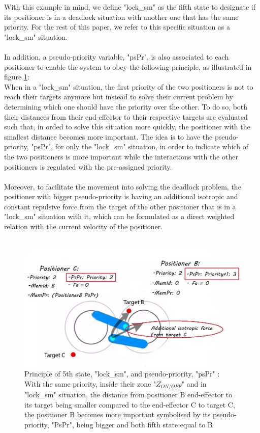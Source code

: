 \documentclass[]{spie}  %
\begin{document}
	
	With this example in mind, we define "lock\_sm" as the fifth state to designate if its positioner is in a deadlock situation with another one that has the same priority. For the rest of this paper, we refer to this specific situation as a "lock\_sm" situation. \\\\
	In addition, a pseudo-priority variable, "psPr", is also associated to each positioner to enable the system to obey the following principle, as illustrated in figure \ref{5thState}:\\
	When in a "lock\_sm" situation, the first priority of the two positioners is not to reach their targets anymore but instead to solve their current problem by determining which one should have the priority over the other. To do so, both their distances from their end-effector to their respective targets are evaluated such that, in orded to solve this situation more quickly, the positioner with the smallest distance becomes more important. The idea is to have the pseudo-priority, "psPr", for only the  "lock\_sm" situation, in order to indicate which of the two positioners is more important while the interactions with the other positioners is regulated with the pre-assigned priority. \\\\
	Moreover, to facilitate the movement into solving the deadlock problem, the positioner with bigger pseudo-priority is having an additional isotropic and constant repulsive force from the target of the other positioner that is in a "lock\_sm" situation with it, which can be formulated as a direct weighted relation with the current velocity of the positioner.\\\\
	
	\begin{figure}[H]
		\centering
		\includegraphics[scale=0.4]{images/5thstate.jpg}
		\caption{\centering Principle of 5th state, "lock\_sm", and pseudo-priority, "psPr" :\\
		With the same priority, inside their zone "$Z_{ON/OFF}$" and in "lock\_sm" situation, the distance from positioner B end-effector to its target being smaller compared to the end-effector C to target C, the positioner B becomes more important symbolised by its pseudo-priority, "PsPr", being bigger and both fifth state equal to B}
		\label{5thState}
	\end{figure}
		
\end{document}
